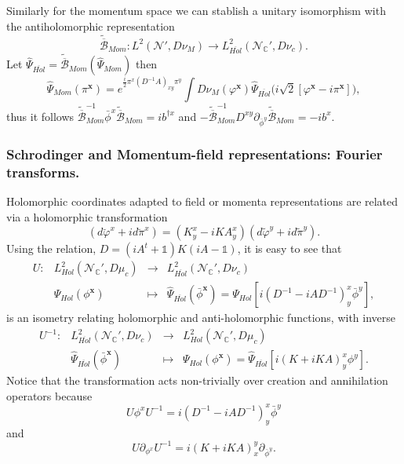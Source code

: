 \documentclass[12pt]{article}%
\begin{document}
Similarly for the momentum space we can stablish a unitary isomorphism with the antiholomorphic representation
$$\tilde{\overline{\mathcal{B}}}_{Mom}:L^2(\mathcal{N}',D\nu_M)\to L^2_{\overline{Hol}}(\mathcal{N}_{\mathbb{C}}', D\nu_c).$$
Let $\hat\Psi_{\overline{Hol}}=\tilde{\overline{\mathcal{B}}}_{Mom}(\hat\Psi_{Mom})$ then  
\begin{equation}
    \label{eq:segalBargmanntransformmomentum}
    \hat\Psi_{Mom}(\pi^{\mathbf{x}})=e^{\frac{i}2\pi^x(D^{-1}A)_{xy}\pi^y}\int D\nu_M(\varphi^{\mathbf{x}})\hat\Psi_{\overline{Hol}}\big(i\sqrt{2}[\varphi^{\mathbf{x}}-i\pi^{\mathbf{x}}]\big),
\end{equation}
thus it follows $\tilde{\overline{\mathcal{B}}}_{Mom}^{-1}\bar\phi^x \tilde{\overline{\mathcal{B}}}_{Mom}=ib^{\dagger x}$ and  $-\tilde{\overline{\mathcal{B}}}_{Mom}^{-1}D^{xy}\partial_{\bar\phi^y} \tilde{\overline{\mathcal{B}}}_{Mom}=-ib^x$.

\subsubsection{Schrodinger and Momentum-field representations: Fourier transforms. }
Holomorphic coordinates adapted to field or momenta representations are related via a holomorphic transformation 
\begin{equation}
\label{eq:changeofvar2}
(d\breve\varphi^x+id\breve\pi^x)=(K^x_y-iKA^x_y)(d\tilde\varphi^y+i d\tilde\pi^y).
\end{equation}
Using the relation, $D=(iA^t+\mathds{1})K(iA-\mathds{1})$, it is easy to see that
\begin{equation}
\label{eq:unitary}
\begin{array}{cccc}
U :&L^2_{Hol}(\mathcal{N}_{\mathbb{C}}', D\mu_c) & \longrightarrow & L^2_{\overline{Hol}}(\mathcal{N}_{\mathbb{C}}', D\nu_c) \\ 
 & \Psi_{Hol}(\phi^{\mathbf{x}}) &\longmapsto & \hat\Psi_{\overline{Hol}}(\bar\phi^{\mathbf{x}})=\Psi_{Hol}[i(D^{-1}-iAD^{-1})^x_y\bar\phi^y],  
\end{array}
\end{equation}
is an isometry relating holomorphic and anti-holomorphic functions,  with  inverse  
\begin{equation}
    \label{eq:unitaryinv}
    \begin{array}{cccc}
    U^{-1} :&L^2_{\overline{Hol}}(\mathcal{N}_{\mathbb{C}}', D\nu_c) & \longrightarrow & L^2_{Hol}(\mathcal{N}_{\mathbb{C}}', D\mu_c) \\ 
     & \hat\Psi_{\overline{Hol}}(\bar\phi^{\mathbf{x}}) &\longmapsto & \Psi_{Hol}(\phi^{\mathbf{x}})=\hat\Psi_{\overline{Hol}}[i(K+iKA)^x_y\phi^y].
    \end{array}
\end{equation}
Notice that the transformation acts non-trivially over creation and annihilation operators because $$U\phi^xU^{-1}=i(D^{-1}-iAD^{-1})^x_y\bar\phi^y$$
 and 
 $$U\partial_{\phi^x}U^{-1}=i(K+iKA)^y_x\partial_{\bar\phi^y}.$$
\end{document}
